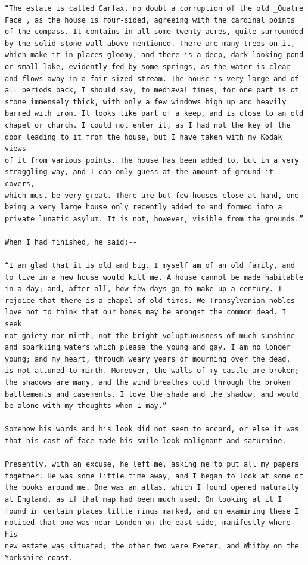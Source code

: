 \documentclass{article}
\begin{document}
\begin{verbatim}
“The estate is called Carfax, no doubt a corruption of the old _Quatre
Face_, as the house is four-sided, agreeing with the cardinal points
of the compass. It contains in all some twenty acres, quite surrounded
by the solid stone wall above mentioned. There are many trees on it,
which make it in places gloomy, and there is a deep, dark-looking pond
or small lake, evidently fed by some springs, as the water is clear
and flows away in a fair-sized stream. The house is very large and of
all periods back, I should say, to mediæval times, for one part is of
stone immensely thick, with only a few windows high up and heavily
barred with iron. It looks like part of a keep, and is close to an old
chapel or church. I could not enter it, as I had not the key of the
door leading to it from the house, but I have taken with my Kodak views
of it from various points. The house has been added to, but in a very
straggling way, and I can only guess at the amount of ground it covers,
which must be very great. There are but few houses close at hand, one
being a very large house only recently added to and formed into a
private lunatic asylum. It is not, however, visible from the grounds.”

When I had finished, he said:--

“I am glad that it is old and big. I myself am of an old family, and
to live in a new house would kill me. A house cannot be made habitable
in a day; and, after all, how few days go to make up a century. I
rejoice that there is a chapel of old times. We Transylvanian nobles
love not to think that our bones may be amongst the common dead. I seek
not gaiety nor mirth, not the bright voluptuousness of much sunshine
and sparkling waters which please the young and gay. I am no longer
young; and my heart, through weary years of mourning over the dead,
is not attuned to mirth. Moreover, the walls of my castle are broken;
the shadows are many, and the wind breathes cold through the broken
battlements and casements. I love the shade and the shadow, and would
be alone with my thoughts when I may.”

Somehow his words and his look did not seem to accord, or else it was
that his cast of face made his smile look malignant and saturnine.

Presently, with an excuse, he left me, asking me to put all my papers
together. He was some little time away, and I began to look at some of
the books around me. One was an atlas, which I found opened naturally
at England, as if that map had been much used. On looking at it I
found in certain places little rings marked, and on examining these I
noticed that one was near London on the east side, manifestly where his
new estate was situated; the other two were Exeter, and Whitby on the
Yorkshire coast.


\end{verbatim}
\end{document}
